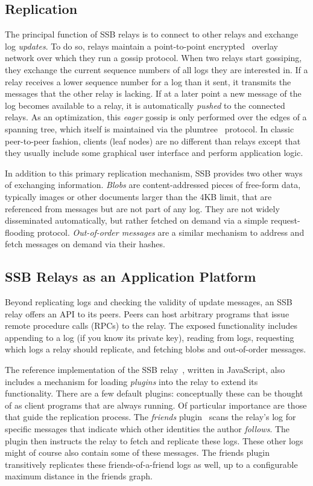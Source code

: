 \documentclass[9pt,sigconf]{acmart}
\begin{document}
\subsection*{Replication}

The principal function of SSB relays is to connect to other relays and
exchange log {\em updates}. To do so, relays maintain a point-to-point
encrypted~\cite{tarr2015secrethandshake} overlay network over which
they run a gossip protocol. When two relays start gossiping, they
exchange the current sequence numbers of all logs they are interested
in. If a relay receives a lower sequence number for a log than it
sent, it transmits the messages that the other relay is lacking. If at
a later point a new message of the log becomes available to a relay,
it is automatically \textit{pushed} to the connected relays. As an
optimization, this {\em eager} gossip is only performed over the edges
of a spanning tree, which itself is maintained via the
plumtree~\cite{leitao2007epidemic} protocol. In classic peer-to-peer
fashion, clients (leaf nodes) are no different than relays except that
they usually include some graphical user interface and perform
application logic.

In addition to this primary replication mechanism, SSB provides two
other ways of exchanging information. {\em Blobs} are
content-addressed pieces of free-form data, typically images or other
documents larger than the 4KB limit, that are referenced from messages
but are not part of any log. They are not widely disseminated
automatically, but rather fetched on demand via a simple
request-flooding protocol. {\em Out-of-order messages} are a similar
mechanism to address and fetch messages on demand via their hashes.

\subsection*{SSB Relays as an Application Platform}

Beyond replicating logs and checking the validity of update messages,
an SSB relay offers an API to its peers. Peers can host arbitrary
programs that issue remote procedure calls (RPCs) to the relay. The
exposed functionality includes appending to a log (if you know its
private key), reading from logs, requesting which logs a relay should
replicate, and fetching blobs and out-of-order messages.

The reference implementation of the SSB relay~\cite{ssb-server},
written in JavaScript, also includes a mechanism for loading {\em
  plugins} into the relay to extend its functionality. There are a few
default plugins: conceptually these can be thought of as client
programs that are always running. Of particular importance are those
that guide the replication process. The {\em friends}
plugin~\cite{ssb-friends} scans the relay's log for specific messages
that indicate which other identities the author {\em follows}. The
plugin then instructs the relay to fetch and replicate these
logs. These other logs might of course also contain some of these
messages. The friends plugin transitively replicates these
friends-of-a-friend logs as well, up to a configurable maximum
distance in the friends graph.
\end{document}
